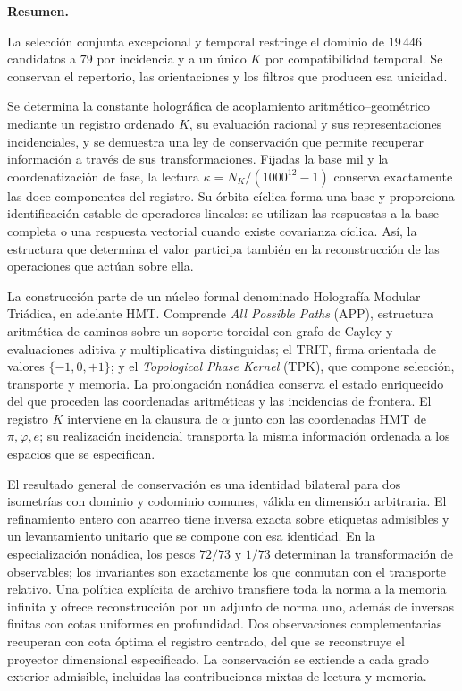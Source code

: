 \noindent\textbf{Resumen.}\par\smallskip
La selección conjunta excepcional y temporal restringe el dominio de \(19\,446\) candidatos a \(79\) por incidencia y a un único \(K\) por compatibilidad temporal. Se conservan el repertorio, las orientaciones y los filtros que producen esa unicidad.

Se determina la constante holográfica de acoplamiento aritmético--geométrico mediante un registro ordenado \(K\), su evaluación racional y sus representaciones incidenciales, y se demuestra una ley de conservación que permite recuperar información a través de sus transformaciones. Fijadas la base mil y la coordenatización de fase, la lectura \(\kappa=N_K/(1000^{12}-1)\) conserva exactamente las doce componentes del registro. Su órbita cíclica forma una base y proporciona identificación estable de operadores lineales: se utilizan las respuestas a la base completa o una respuesta vectorial cuando existe covarianza cíclica. Así, la estructura que determina el valor participa también en la reconstrucción de las operaciones que actúan sobre ella.

La construcción parte de un núcleo formal denominado Holografía Modular Triádica, en adelante HMT. Comprende \emph{All Possible Paths} (APP), estructura aritmética de caminos sobre un soporte toroidal con grafo de Cayley y evaluaciones aditiva y multiplicativa distinguidas; el TRIT, firma orientada de valores \(\{-1,0,+1\}\); y el \emph{Topological Phase Kernel} (TPK), que compone selección, transporte y memoria. La prolongación nonádica conserva el estado enriquecido del que proceden las coordenadas aritméticas y las incidencias de frontera. El registro \(K\) interviene en la clausura de \(\alpha\) junto con las coordenadas HMT de \(\pi,\varphi,e\); su realización incidencial transporta la misma información ordenada a los espacios que se especifican.

El resultado general de conservación es una identidad bilateral para dos isometrías con dominio y codominio comunes, válida en dimensión arbitraria. El refinamiento entero con acarreo tiene inversa exacta sobre etiquetas admisibles y un levantamiento unitario que se compone con esa identidad. En la especialización nonádica, los pesos \(72/73\) y \(1/73\) determinan la transformación de observables; los invariantes son exactamente los que conmutan con el transporte relativo. Una política explícita de archivo transfiere toda la norma a la memoria infinita y ofrece reconstrucción por un adjunto de norma uno, además de inversas finitas con cotas uniformes en profundidad. Dos observaciones complementarias recuperan con cota óptima el registro centrado, del que se reconstruye el proyector dimensional especificado. La conservación se extiende a cada grado exterior admisible, incluidas las contribuciones mixtas de lectura y memoria.

